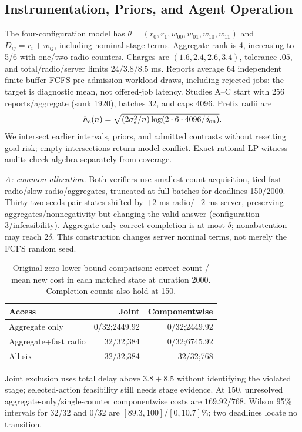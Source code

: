 \subsection{Instrumentation, Priors, and Agent Operation}
\label{app:operating-study}
The four-configuration model has $\theta=(r_0,r_1,w_{00},w_{01},w_{10},w_{11})$ and $D_{ij}=r_i+w_{ij}$, including nominal stage terms. Aggregate rank is 4, increasing to 5/6 with one/two radio counters. Charges are $(1.6,2.4,2.6,3.4)$, tolerance $.05$, and total/radio/server limits $24/3.8/8.5$ ms. Reports average 64 independent finite-buffer FCFS pre-admission workload draws, including rejected jobs: the target is diagnostic mean, not offered-job latency. Studies A--C start with 256 reports/aggregate (sunk 1920), batches 32, and caps 4096. Prefix radii are
$$h_e(n)=\sqrt{(2\sigma_e^2/n)\log(2\cdot6\cdot4096/\delta_{\rm on})}.$$
We intersect earlier intervals, priors, and admitted contrasts without resetting goal risk; empty intersections return model conflict. Exact-rational LP-witness audits check algebra separately from coverage.

\emph{A: common allocation.} Both verifiers use smallest-count acquisition, tied fast radio/slow radio/aggregates, truncated at full batches for deadlines 150/2000. Thirty-two seeds pair states shifted by $+2$ ms radio/$-2$ ms server, preserving aggregates/nonnegativity but changing the valid answer (configuration 3/infeasibility). Aggregate-only correct completion is at most $\delta$; nonabstention may reach $2\delta$. This construction changes server nominal terms, not merely the FCFS random seed.
\begin{table}[t]
\centering\small
\caption{Original zero-lower-bound comparison: correct count / mean new cost in each matched state at duration 2000. Completion counts also hold at 150.}
\label{tab:v41-capability}
\begin{tabular}{@{}lrr@{}}
\toprule
Access&Joint&Componentwise\\
\midrule
Aggregate only&0/32;2449.92&0/32;2449.92\\
Aggregate+fast radio&32/32;384&0/32;6745.92\\
All six&32/32;384&32/32;768\\
\bottomrule
\end{tabular}
\end{table}
Joint exclusion uses total delay above $3.8+8.5$ without identifying the violated stage; selected-action feasibility still needs stage evidence. At 150, unresolved aggregate-only/single-counter componentwise costs are $169.92/768$. Wilson 95\% intervals for 32/32 and 0/32 are $[89.3,100]/[0,10.7]\%$; two deadlines locate no transition.

